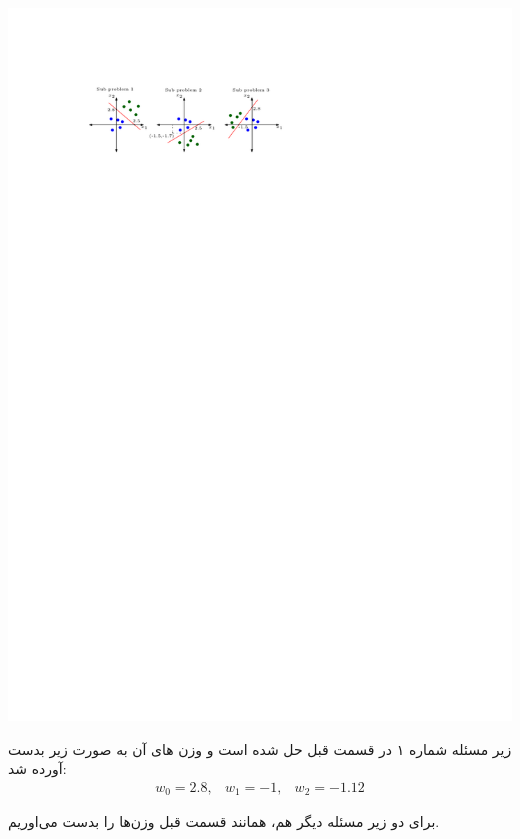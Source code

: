 \begin{enumerate}
\begin{qsolve}
		\begin{center}
			\includegraphics*[width=1\linewidth]{pics/img4.pdf}
			\label{داده های شکسته شده به سه بخش}
		\end{center}
		
		
		زیر مسئله شماره ۱ در قسمت قبل حل شده است و وزن های آن به صورت زیر بدست آورده شد:
		\begin{eqnarray*}
			w_0=2.8, &w_1=-1, &w_2=-1.12
		\end{eqnarray*}
		
		برای دو زیر مسئله دیگر هم، همانند قسمت قبل وزن‌ها را بدست می‌اوریم.
		

\end{qsolve}
\end{enumerate}
